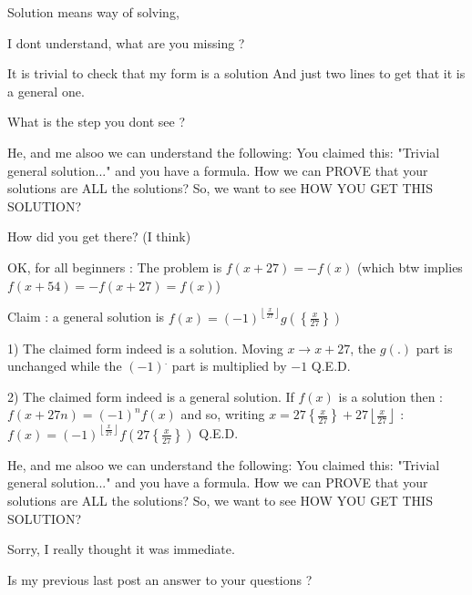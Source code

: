 \begin{solution}
	\begin{tcolorbox}Solution means way of solving, \end{tcolorbox}
I dont understand, what are you missing ?

It is trivial to check that my form is a solution
And just two lines to get that it is a general one.

What is the step you dont see ?


\end{solution}



\begin{solution}
	He, and me alsoo we can understand the following:
You claimed this: "Trivial general solution..." and you have a formula.
How we can PROVE that your solutions are ALL the solutions?
So, we want to see HOW YOU GET THIS SOLUTION?
\end{solution}



\begin{solution}
	How did you get there? (I think)
\end{solution}



\begin{solution}
	OK, for all beginners :
The problem is $f(x+27)=-f(x)$
(which btw implies $f(x+54)=-f(x+27)=f(x)$)

Claim : a general solution is 
$f(x)=(-1)^{\left\lfloor\frac x{27}\right\rfloor}g(\left\{\frac x{27}\right\})$

1)  The claimed form indeed is a solution.
Moving $x\to x+27$, the $g(.)$ part is unchanged while the $(-1)^.$ part is multiplied by $-1$
Q.E.D.

2) The claimed form indeed is a general solution.
If $f(x)$ is a solution then :
$f(x+27n)=(-1)^nf(x)$ and so, writing $x=27\left\{\frac x{27}\right\}+27\left\lfloor\frac x{27}\right\rfloor$ :
$f(x)=(-1)^{\left\lfloor\frac x{27}\right\rfloor}f(27\left\{\frac x{27}\right\})$
Q.E.D.
\end{solution}



\begin{solution}
	\begin{tcolorbox}He, and me alsoo we can understand the following:
You claimed this: "Trivial general solution..." and you have a formula.
How we can PROVE that your solutions are ALL the solutions?
So, we want to see HOW YOU GET THIS SOLUTION?\end{tcolorbox}
Sorry, I really thought it was immediate.

Is my previous last post an answer to your questions ?


\end{solution}



